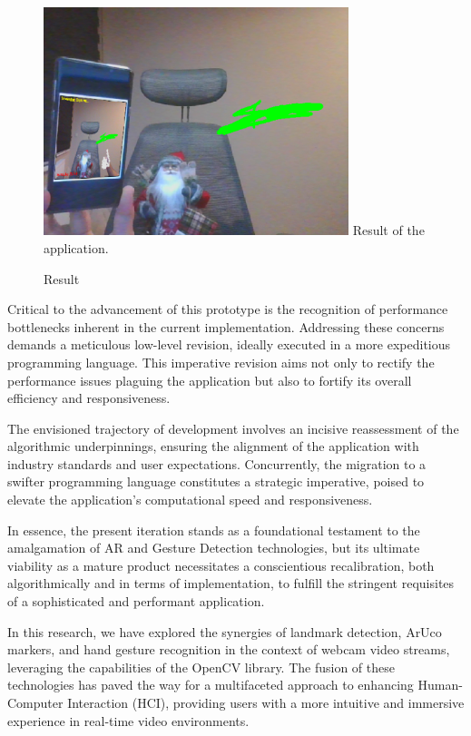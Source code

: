 \documentclass[journal]{IEEEtran}
\begin{document}
\begin{figure}[!t]
  \centering
  \includegraphics[width=3.5in]{photo/3.png}
  Result of the application.
  \caption{Result}
  \label{fig:result}
\end{figure}

Critical to the advancement of this prototype is the recognition of performance bottlenecks inherent in the current implementation. 
Addressing these concerns demands a meticulous low-level revision, ideally executed in a more expeditious programming language. 
This imperative revision aims not only to rectify the performance issues plaguing the application but also to fortify its overall efficiency 
and responsiveness.

The envisioned trajectory of development involves an incisive reassessment of the algorithmic underpinnings, ensuring the alignment of 
the application with industry standards and user expectations. Concurrently, the migration to a swifter programming language constitutes 
a strategic imperative, poised to elevate the application's computational speed and responsiveness.

In essence, the present iteration stands as a foundational testament to the amalgamation of AR and Gesture Detection technologies, 
but its ultimate viability as a mature product necessitates a conscientious recalibration, both algorithmically and in terms of implementation, 
to fulfill the stringent requisites of a sophisticated and performant application.

In this research, we have explored the synergies of landmark detection, ArUco markers, and hand gesture recognition in the context 
of webcam video streams, leveraging the capabilities of the OpenCV library. The fusion of these technologies has paved the way for 
a multifaceted approach to enhancing Human-Computer Interaction (HCI), providing users with a more intuitive and immersive 
experience in real-time video environments.
\end{document}
